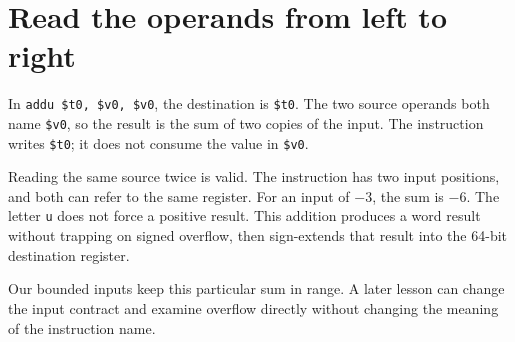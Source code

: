 \section{Read the operands from left to
  right}\label{001-console-calculation-p09-read-the-operands-from-left-to-right}

In \texttt{addu\ \$t0,\ \$v0,\ \$v0}, the destination is \texttt{\$t0}.
The two source operands both name \texttt{\$v0}, so the result is the
sum of two copies of the input. The instruction writes \texttt{\$t0}; it
does not consume the value in \texttt{\$v0}.

Reading the same source twice is valid. The instruction has two input
positions, and both can refer to the same register. For an input of \ensuremath{-}3,
the sum is \ensuremath{-}6. The letter \texttt{u} does not force a positive result.
This addition produces a word result without trapping on signed
overflow, then sign-extends that result into the 64-bit destination
register.

Our bounded inputs keep this particular sum in range. A later lesson can
change the input contract and examine overflow directly without changing
the meaning of the instruction name.
